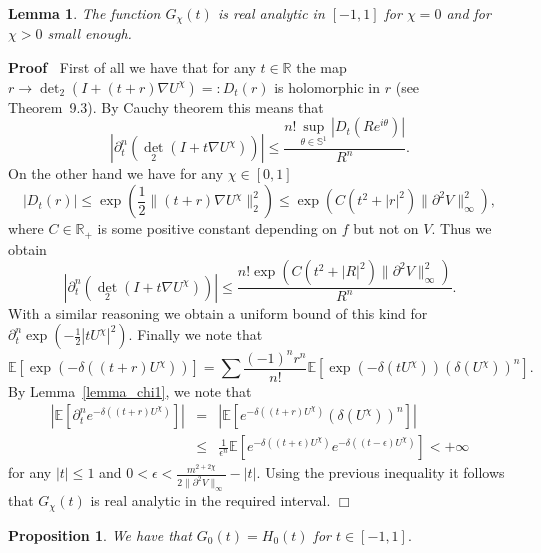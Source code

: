 \documentclass[a4paper,10pt]{article}
\newenvironment{proof}{\noindent\textbf{Proof\ }}{\hspace*{\fill}$\Box$\medskip}
\newtheorem{lemma}[theorem]{Lemma}
\newtheorem{proposition}[theorem]{Proposition}
{\theorembodyfont{\rmfamily}\newtheorem{remark}[theorem]{Remark}}
\begin{document}
\begin{lemma}
  \label{lemma_chi2}The function $G_{\chi} (t)$ is real analytic in $[- 1, 1]$ for $\chi=0$ and for $\chi>0$ small enough.
\end{lemma}

\begin{proof}
  First of all we have that for any $t \in \mathbb{R}$ the map $r \rightarrow
  \det_2 (I + (t + r) \nabla U^{\chi}) = : D_t (r)$ is holomorphic in $r$
  (see~{\cite{Simon2005}} Theorem~9.3). By Cauchy theorem this means that
  \[ | \partial^n_t (\det_2 (I + t \nabla U^{\chi})) | \leqslant \frac{n!
     \sup_{\theta \in \mathbb{S}^1} | D_t (R e^{i \theta}) |}{R^n} . \]
  On the other hand we have for any $\chi \in [0, 1]$
  \[ | D_t (r) | \leqslant \exp \left( \frac{1}{2} \| (t + r) \nabla U^{\chi}
     \|^2_2 \right) \leqslant \exp (C (t^2 + | r |^2) \| \partial^2 V
     \|^2_{\infty}), \]
  where $C \in \mathbb{R}_+$ is some positive constant depending on $f$ but
  not on $V$. Thus we obtain
  \[ | \partial^n_t (\det_2 (I + t \nabla U^{\chi})) | \leqslant \frac{n! \exp
     (C (t^2 + | R |^2) \| \partial^2 V \|^2_{\infty})}{R^n} . \]
  With a similar reasoning we obtain a uniform bound of this kind for
  $\partial^n_t \exp \left( - \frac{1}{2} | t U^{\chi} |^2 \right) .$ Finally
  we note that
  \[ \mathbb{E} [\exp (- \delta ((t + r) U^{\chi}))] = \sum \frac{(- 1)^n
     r^n}{n!} \mathbb{E} [\exp (- \delta (t U^{\chi})) (\delta (U^{\chi}))^n]
     . \]
  By Lemma~\ref{lemma_chi1}, we note that
  \begin{eqnarray}
    | \mathbb{E} [\partial^n_t e^{- \delta ((t + r) U^{\chi})}] | & = & |
    \mathbb{E} [e^{- \delta ((t + r) U^{\chi})} (\delta (U^{\chi}))^n] |
    \nonumber\\
    & \leqslant & \frac{1}{\epsilon^n} \mathbb{E} [e^{- \delta ((t +
    \epsilon) U^{\chi})} e^{- \delta ((t - \epsilon) U^{\chi})}] < + \infty
    \nonumber
  \end{eqnarray}
  for any $| t | \leqslant 1$ and $0 < \epsilon < \frac{m^{2+2\chi}}{2 \| \partial^2 V
  \|_{\infty}} - | t | .$ Using the previous inequality it follows that
  $G_{\chi} (t)$ is real analytic in the required interval. 
\end{proof}

\begin{proposition}
  \label{proposition_chi}We have that $G_0 (t) = H_0 (t)$ for $t \in [- 1, 1]
  .$
\end{proposition}
\end{document}
